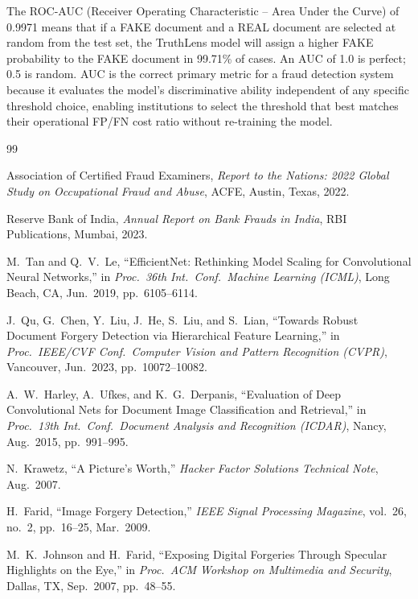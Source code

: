 \documentclass[12pt,a4paper,oneside]{report}
\begin{document}
\begin{enumerate}[leftmargin=*, wide]
The ROC-AUC (Receiver Operating Characteristic -- Area Under the Curve) of
0.9971 means that if a FAKE document and a REAL document are selected at random
from the test set, the TruthLens model will assign a higher FAKE probability to
the FAKE document in 99.71\% of cases. An AUC of 1.0 is perfect; 0.5 is random.
AUC is the correct primary metric for a fraud detection system because it evaluates
the model's discriminative ability independent of any specific threshold choice,
enabling institutions to select the threshold that best matches their operational
FP/FN cost ratio without re-training the model.

\end{enumerate}
\newpage
\begin{thebibliography}{99}
 
Association of Certified Fraud Examiners,
\textit{Report to the Nations: 2022 Global Study on Occupational Fraud and Abuse},
ACFE, Austin, Texas, 2022.
 
Reserve Bank of India,
\textit{Annual Report on Bank Frauds in India},
RBI Publications, Mumbai, 2023.
 
M.~Tan and Q.~V.~Le,
``EfficientNet: Rethinking Model Scaling for Convolutional Neural Networks,''
in \textit{Proc.\ 36th Int.\ Conf.\ Machine Learning (ICML)},
Long Beach, CA, Jun.\ 2019, pp.~6105--6114.
 
J.~Qu, G.~Chen, Y.~Liu, J.~He, S.~Liu, and S.~Lian,
``Towards Robust Document Forgery Detection via Hierarchical Feature Learning,''
in \textit{Proc.\ IEEE/CVF Conf.\ Computer Vision and Pattern Recognition (CVPR)},
Vancouver, Jun.\ 2023, pp.~10072--10082.
 
A.~W.~Harley, A.~Ufkes, and K.~G.~Derpanis,
``Evaluation of Deep Convolutional Nets for Document Image Classification and Retrieval,''
in \textit{Proc.\ 13th Int.\ Conf.\ Document Analysis and Recognition (ICDAR)},
Nancy, Aug.\ 2015, pp.~991--995.
 
N.~Krawetz,
``A Picture's Worth,''
\textit{Hacker Factor Solutions Technical Note}, Aug.\ 2007.
 
H.~Farid,
``Image Forgery Detection,''
\textit{IEEE Signal Processing Magazine},
vol.~26, no.~2, pp.~16--25, Mar.\ 2009.
 
M.~K.~Johnson and H.~Farid,
``Exposing Digital Forgeries Through Specular Highlights on the Eye,''
in \textit{Proc.\ ACM Workshop on Multimedia and Security},
Dallas, TX, Sep.\ 2007, pp.~48--55.
 

\end{thebibliography}
\end{document}
